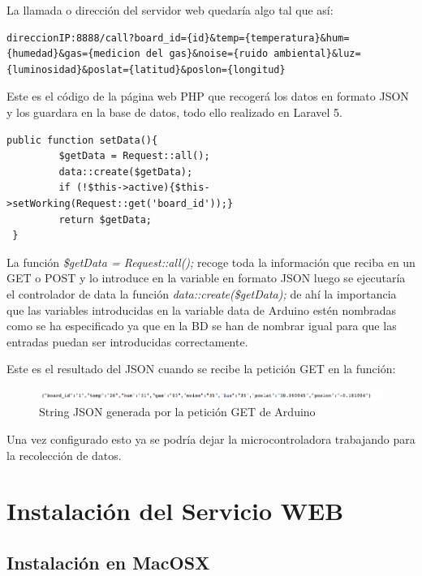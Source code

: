 La llamada o dirección del servidor web quedaría algo tal que así: 

\begin{lstlisting}[caption=Formato de la String GET, label=getstring]
	direccionIP:8888/call?board_id={id}&temp={temperatura}&hum={humedad}&gas={medicion del gas}&noise={ruido ambiental}&luz={luminosidad}&poslat={latitud}&poslon={longitud}
\end{lstlisting}

Este es el código de la página web PHP que recogerá los datos en formato JSON y los guardara en la base de datos, todo ello realizado en Laravel 5.

\begin{lstlisting}[caption=Controller que almacena la String en la BD, label=getstring]
 public function setData(){
		 $getData = Request::all();
		 data::create($getData);
		 if (!$this->active){$this->setWorking(Request::get('board_id'));}
		 return $getData;
 }
\end{lstlisting}

La función \textit{\$getData = Request::all();} recoge toda la información que reciba en un GET o POST y lo introduce en la variable en formato JSON luego se ejecutaría el controlador de data la función \textit{data::create(\$getData);} de ahí la importancia que las variables introducidas en la variable data de Arduino estén nombradas como se ha especificado ya que en la BD se han de nombrar igual para que las entradas puedan ser introducidas correctamente.

Este es el resultado del JSON cuando se recibe la petición GET en la función:

\begin{figure}[!h]
	\centering
	\includegraphics[width=1.0\linewidth]{figuras/jsonstring}
	\caption{String JSON generada por la petición GET de Arduino}
	\label{fig:montfin}
\end{figure}

Una vez configurado esto ya se podría dejar la microcontroladora trabajando para la recolección de datos.

\section{Instalación del Servicio WEB}
\subsection{Instalación en MacOSX}

